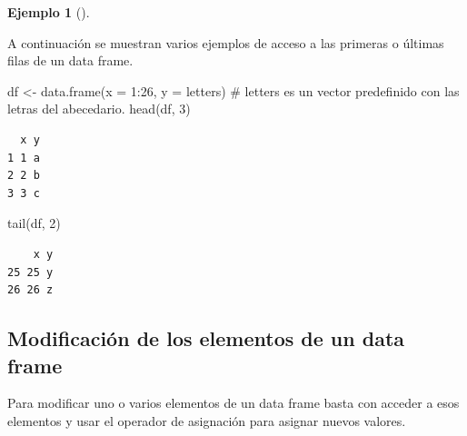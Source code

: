 \documentclass[
  a4paper,
]{scrreport}
\newenvironment{Shaded}{\begin{snugshade}}{\end{snugshade}}
\newcommand{\AttributeTok}[1]{\textcolor[rgb]{0.40,0.45,0.13}{#1}}
\newcommand{\CommentTok}[1]{\textcolor[rgb]{0.37,0.37,0.37}{#1}}
\newcommand{\DecValTok}[1]{\textcolor[rgb]{0.68,0.00,0.00}{#1}}
\newcommand{\FunctionTok}[1]{\textcolor[rgb]{0.28,0.35,0.67}{#1}}
\newcommand{\NormalTok}[1]{\textcolor[rgb]{0.00,0.23,0.31}{#1}}
\newcommand{\OtherTok}[1]{\textcolor[rgb]{0.00,0.23,0.31}{#1}}
\newcommand{\SpecialCharTok}[1]{\textcolor[rgb]{0.37,0.37,0.37}{#1}}
\theoremstyle{definition}
\newtheorem{example}{Ejemplo}[chapter]
\theoremstyle{definition}
\theoremstyle{remark}
\begin{document}
\leavevmode{}%
\begin{example}[]\label{exm-acceso-primeras-ultimas-filas-data-frame}

A continuación se muestran varios ejemplos de acceso a las primeras o
últimas filas de un data frame.

\begin{Shaded}
\begin{Highlighting}[]
\NormalTok{df }\OtherTok{\textless{}{-}} \FunctionTok{data.frame}\NormalTok{(}\AttributeTok{x =} \DecValTok{1}\SpecialCharTok{:}\DecValTok{26}\NormalTok{, }\AttributeTok{y =}\NormalTok{ letters) }\CommentTok{\# letters es un vector predefinido con las letras del abecedario.}
\FunctionTok{head}\NormalTok{(df, }\DecValTok{3}\NormalTok{)}
\end{Highlighting}
\end{Shaded}

\begin{verbatim}
  x y
1 1 a
2 2 b
3 3 c
\end{verbatim}

\begin{Shaded}
\begin{Highlighting}[]
\FunctionTok{tail}\NormalTok{(df, }\DecValTok{2}\NormalTok{)}
\end{Highlighting}
\end{Shaded}

\begin{verbatim}
    x y
25 25 y
26 26 z
\end{verbatim}

\end{example}

\hypertarget{modificaciuxf3n-de-los-elementos-de-un-data-frame}{%
\subsection{Modificación de los elementos de un data
frame}\label{modificaciuxf3n-de-los-elementos-de-un-data-frame}}

Para modificar uno o varios elementos de un data frame basta con acceder
a esos elementos y usar el operador de asignación para asignar nuevos
valores.
\end{document}
